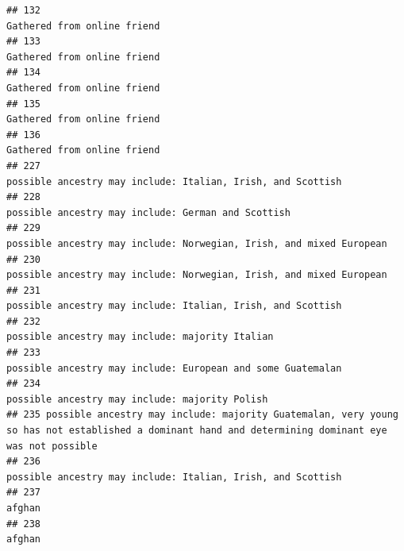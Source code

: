 \documentclass[]{article}
\begin{document}
\begin{verbatim}
## 132                                                                                                                         Gathered from online friend
## 133                                                                                                                         Gathered from online friend
## 134                                                                                                                         Gathered from online friend
## 135                                                                                                                         Gathered from online friend
## 136                                                                                                                         Gathered from online friend
## 227                                                                                         possible ancestry may include: Italian, Irish, and Scottish
## 228                                                                                                  possible ancestry may include: German and Scottish
## 229                                                                                 possible ancestry may include: Norwegian, Irish, and mixed European
## 230                                                                                 possible ancestry may include: Norwegian, Irish, and mixed European
## 231                                                                                         possible ancestry may include: Italian, Irish, and Scottish
## 232                                                                                                     possible ancestry may include: majority Italian
## 233                                                                                         possible ancestry may include: European and some Guatemalan
## 234                                                                                                      possible ancestry may include: majority Polish
## 235 possible ancestry may include: majority Guatemalan, very young so has not established a dominant hand and determining dominant eye was not possible
## 236                                                                                         possible ancestry may include: Italian, Irish, and Scottish
## 237                                                                                                                                              afghan
## 238                                                                                                                                              afghan

\end{verbatim}
\end{document}
